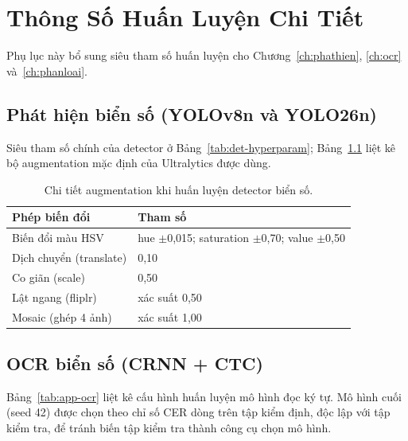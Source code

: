 \chapter{Thông Số Huấn Luyện Chi Tiết}
\label{app:huanluyen}

Phụ lục này bổ sung siêu tham số huấn luyện cho Chương~\ref{ch:phathien}, \ref{ch:ocr} và~\ref{ch:phanloai}.

\section{Phát hiện biển số (YOLOv8n và YOLO26n)}

Siêu tham số chính của detector ở Bảng~\ref{tab:det-hyperparam}; Bảng~\ref{tab:app-det-aug} liệt kê bộ augmentation mặc định của Ultralytics được dùng.

\begin{table}[htbp]
\centering
\caption{Chi tiết augmentation khi huấn luyện detector biển số.}
\label{tab:app-det-aug}

\vspace{4pt}
\begin{tabular}{@{}p{6.5cm}p{6.5cm}@{}}
\toprule
\textbf{Phép biến đổi} & \textbf{Tham số} \\
\midrule
Biến đổi màu HSV & hue $\pm$0,015; saturation $\pm$0,70; value $\pm$0,50 \\
Dịch chuyển (translate) & 0,10 \\
Co giãn (scale) & 0,50 \\
Lật ngang (fliplr) & xác suất 0,50 \\
Mosaic (ghép 4 ảnh) & xác suất 1,00 \\
\bottomrule
\end{tabular}
\end{table}

\section{OCR biển số (CRNN + CTC)}

Bảng~\ref{tab:app-ocr} liệt kê cấu hình huấn luyện mô hình đọc ký tự. Mô hình cuối (seed 42) được chọn theo chỉ số CER dòng trên tập kiểm định, độc lập với tập kiểm tra, để tránh biến tập kiểm tra thành công cụ chọn mô hình.

